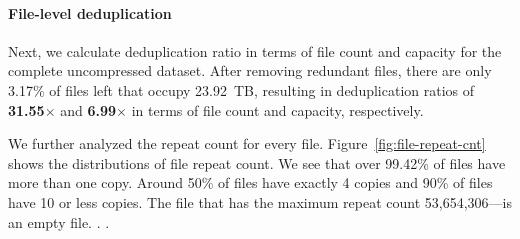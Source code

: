 \paragraph{File-level deduplication}
%
Next, we calculate deduplication ratio in terms of file count and capacity for
the complete uncompressed dataset.
%
After removing redundant files, there are only 3.17\% of files left that occupy
23.92~TB, resulting in deduplication ratios of \textbf{31.55$\times$} and
\textbf{6.99$\times$} in terms of file count and capacity, respectively.
%

%
We further analyzed the repeat count for every file.
%
Figure~\ref{fig:file-repeat-cnt} shows the distributions of file repeat count.  
%
We see that over 99.42\% of files have more than one copy.
%
Around 50\% of files have exactly 4 copies and 90\% of files have 10 or less
copies. 
%
The file that has the maximum repeat count 53,654,306---is an empty file.
%
.
%
.

